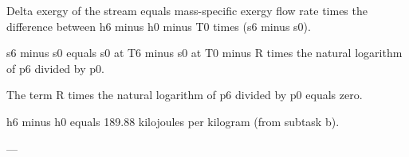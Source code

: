 Delta exergy of the stream equals mass-specific exergy flow rate times the difference between h6 minus h0 minus T0 times (s6 minus s0).  

s6 minus s0 equals s0 at T6 minus s0 at T0 minus R times the natural logarithm of p6 divided by p0.  

The term R times the natural logarithm of p6 divided by p0 equals zero.  

h6 minus h0 equals 189.88 kilojoules per kilogram (from subtask b).  

---